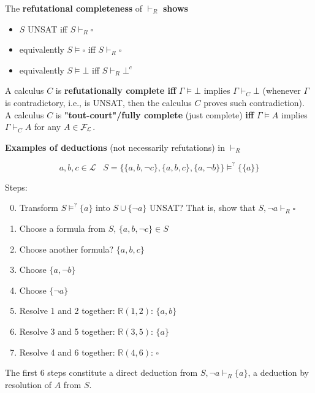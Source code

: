 The \textbf{refutational completeness} of $\vdash_R$ \textbf{shows} 
\begin{itemize}[label*=]
	\item \phantom{equivalently} $S$ UNSAT iff $S \vdash_R \square$
	\item equivalently $S \models \square$ iff $S \vdash_R \square$
	\item equivalently $S \models \bot$ iff $S \vdash_R \bot^c$ %
\end{itemize}

A calculus $C$ is \textbf{refutationally complete iff} $\Gamma \models \bot$ implies $\Gamma \vdash_C \bot$ (whenever $\Gamma$ is contradictory, i.e., is UNSAT, then the calculus $C$ proves such contradiction).\\

A calculus $C$ is \textbf{"tout-court"/fully complete} (just complete) \textbf{iff} $\Gamma \models A$ implies $\Gamma \vdash_C A$ for any $A \in \mathcal{F}_\mathcal{L}$.\\

\newpage

\textbf{Examples of deductions} (not necessarily refutations) in $\vdash_R$

$$ a,b,c \in \mathcal{L} \;\;\; S = \{\{a,b,\neg c\}, \{a,b,c\}, \{a, \neg b\} \} \models^? \{\{a\}\}$$

Steps: 
\begin{enumerate}
	\setcounter{enumi}{-1}
	\item Transform $S \models^? \{a\}$ into $S \cup \{\neg a\}$ UNSAT? That is, show that $S, \neg a \vdash_R \square$
	\item Choose a formula from $S$, $\{a,b, \neg c\} \in S$
	\item Choose another formula? $\{a,b,c\}$
	\item Choose $\{a, \neg b\}$
	\item Choose $\{\neg a\}$
	\item Resolve 1 and 2 together: $\mathbb{R}(1,2)$: $\{a, b\}$
	\item Resolve 3 and 5 together: $\mathbb{R}(3,5)$: $\{a\}$
	\item Resolve 4 and 6 together: $\mathbb{R}(4,6)$: $\square$
\end{enumerate}


The first 6 steps constitute a direct deduction from $S, \neg a \vdash_R \{a\}$, a deduction by resolution of $A$ from $S$.\\

